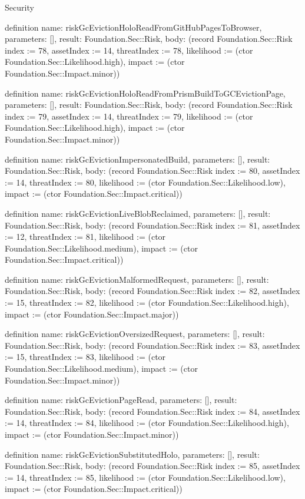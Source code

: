 \begin{lexlean}{Security}
\begin{semanticmodule}
definition{
  name: riskGcEvictionHoloReadFromGitHubPagesToBrowser,
  parameters: [],
  result: Foundation.Sec::Risk,
  body: (record Foundation.Sec::Risk {index := 78, assetIndex := 14, threatIndex := 78, likelihood := (ctor Foundation.Sec::Likelihood.high), impact := (ctor Foundation.Sec::Impact.minor)})
}

definition{
  name: riskGcEvictionHoloReadFromPrismBuildToGCEvictionPage,
  parameters: [],
  result: Foundation.Sec::Risk,
  body: (record Foundation.Sec::Risk {index := 79, assetIndex := 14, threatIndex := 79, likelihood := (ctor Foundation.Sec::Likelihood.high), impact := (ctor Foundation.Sec::Impact.minor)})
}

definition{
  name: riskGcEvictionImpersonatedBuild,
  parameters: [],
  result: Foundation.Sec::Risk,
  body: (record Foundation.Sec::Risk {index := 80, assetIndex := 14, threatIndex := 80, likelihood := (ctor Foundation.Sec::Likelihood.low), impact := (ctor Foundation.Sec::Impact.critical)})
}

definition{
  name: riskGcEvictionLiveBlobReclaimed,
  parameters: [],
  result: Foundation.Sec::Risk,
  body: (record Foundation.Sec::Risk {index := 81, assetIndex := 12, threatIndex := 81, likelihood := (ctor Foundation.Sec::Likelihood.medium), impact := (ctor Foundation.Sec::Impact.critical)})
}

definition{
  name: riskGcEvictionMalformedRequest,
  parameters: [],
  result: Foundation.Sec::Risk,
  body: (record Foundation.Sec::Risk {index := 82, assetIndex := 15, threatIndex := 82, likelihood := (ctor Foundation.Sec::Likelihood.high), impact := (ctor Foundation.Sec::Impact.major)})
}

definition{
  name: riskGcEvictionOversizedRequest,
  parameters: [],
  result: Foundation.Sec::Risk,
  body: (record Foundation.Sec::Risk {index := 83, assetIndex := 15, threatIndex := 83, likelihood := (ctor Foundation.Sec::Likelihood.medium), impact := (ctor Foundation.Sec::Impact.minor)})
}

definition{
  name: riskGcEvictionPageRead,
  parameters: [],
  result: Foundation.Sec::Risk,
  body: (record Foundation.Sec::Risk {index := 84, assetIndex := 14, threatIndex := 84, likelihood := (ctor Foundation.Sec::Likelihood.high), impact := (ctor Foundation.Sec::Impact.minor)})
}

definition{
  name: riskGcEvictionSubstitutedHolo,
  parameters: [],
  result: Foundation.Sec::Risk,
  body: (record Foundation.Sec::Risk {index := 85, assetIndex := 14, threatIndex := 85, likelihood := (ctor Foundation.Sec::Likelihood.low), impact := (ctor Foundation.Sec::Impact.critical)})
}


\end{semanticmodule}
\end{lexlean}
